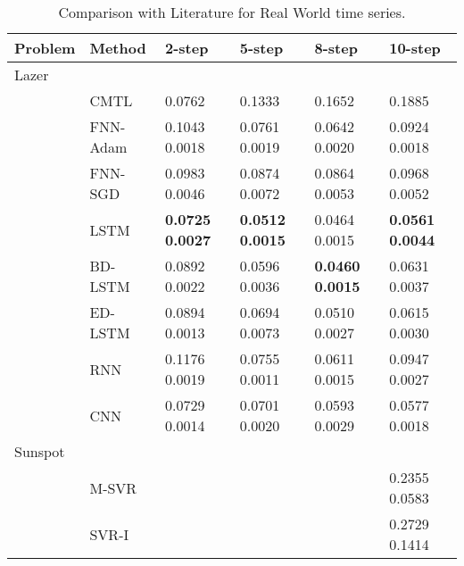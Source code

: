 \documentclass[final,5p,times,twocolumn]{elsarticle}
\begin{document}
\begin{table*}[htbp!]

\centering
 \small
 \caption{Comparison with Literature for Real World time series. }
  


\label{tab:Real}
\begin{tabular}{llllll}

  
 \hline
Problem& Method& 2-step & 5-step &8-step& 10-step\\
 \hline
 \hline


Lazer &    	&   	& \\
 






 
&CMTL \cite{chandra2017CMTLMulti} &  0.0762  &  0.1333  	& 0.1652& 0.1885  \\


&FNN-Adam &  0.1043   0.0018    	& 0.0761   0.0019       &	0.0642	 0.0020       &0.0924	0.0018\\

&FNN-SGD  & 0.0983    0.0046     	&   0.0874   0.0072     &	0.0864 	0.0053       &0.0968	0.0052\\

&LSTM   &  \textbf{0.0725  0.0027 }   	&  \textbf{0.0512    0.0015}      &	0.0464 	0.0015       &\textbf{0.0561	0.0044}\\

&BD-LSTM   &  0.0892   0.0022     	&   0.0596   0.0036      &\textbf{0.0460 	0.0015}	       &0.0631	0.0037\\

&ED-LSTM   &  0.0894   0.0013     	& 0.0694   0.0073       &	0.0510 	0.0027       &0.0615	0.0030\\

&RNN  &   0.1176   0.0019    	&  0.0755  0.0011      &0.0611 	0.0015	       &0.0947	0.0027\\

&CNN &  0.0729	0.0014    	&  0.0701	0.0020      & 0.0593	0.0029	       & 0.0577	0.0018\\

 \hline
 
 
Sunspot &    	  &	& \\
 

 &M-SVR \cite{zhang2013iterated} &   	&   &	 & 0.2355   0.0583 \\
 
 &  SVR-I \cite{zhang2013iterated}&   	&   &	 &  0.2729 0.1414  \\
 

\end{tabular}
\end{table*}
\end{document}
